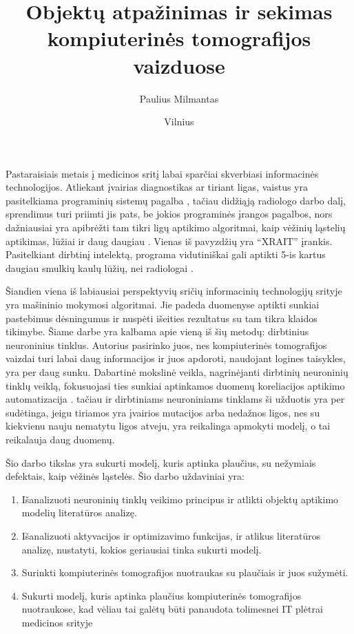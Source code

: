 \documentclass{VUMIFInfKursinis}
\title{Objektų atpažinimas ir sekimas kompiuterinės tomografijos vaizduose}
\author{Paulius Milmantas}
\date{Vilnius \\ \the\year}
\begin{document}
\maketitle

Pastaraisiais metais į medicinos sritį labai sparčiai skverbiasi informacinės technologijos. Atliekant
įvairias diagnostikas ar tiriant ligas, vaistus yra pasitelkiama programinių sistemų pagalba \cite{salt22}, tačiau
didžiąją radiologo darbo dalį, sprendimus turi priimti jis pats, be jokios programinės įrangos pagalbos,
nors dažniausiai yra apibrėžti tam tikri ligų aptikimo algoritmai, kaip vėžinių ląstelių aptikimas,
lūžiai ir daug daugiau \cite{salt23}. Vienas iš pavyzdžių yra \enquote{XRAIT} įrankis. Pasitelkiant dirbtinį intelektą, programa vidutiniškai gali aptikti 5-is kartus daugiau smulkių kaulų lūžių, nei radiologai \cite{salt25}.
\par
Šiandien viena iš labiausiai perspektyvių sričių informacinių technologijų srityje yra mašininio mokymosi algoritmai. 
Jie padeda duomenyse aptikti sunkiai pastebimus dėsningumus ir nuspėti išeities rezultatus su tam tikra klaidos tikimybe.
Šiame darbe yra kalbama apie vieną iš šių metodų: dirbtinius neuroninius tinklus.
Autorius pasirinko juos, nes kompiuterinės tomografijos vaizdai turi labai daug informacijos ir juos apdoroti,
naudojant logines taisykles, yra per daug sunku. 
Dabartinė mokslinė veikla, nagrinėjanti dirbtinių neuroninių tinklų veiklą,
fokusuojasi ties sunkiai aptinkamos duomenų koreliacijos aptikimo
automatizacija \cite{salt24}.
tačiau ir dirbtiniams neuroniniams tinklams ši užduotis yra per sudėtinga, jeigu
tiriamos yra įvairios mutacijos arba nedažnos ligos, nes su kiekvienu nauju nematytu ligos atveju,
yra reikalinga apmokyti modelį, o tai reikalauja daug duomenų. 
\par
Šio darbo tikslas yra sukurti modelį, kuris aptinka plaučius, su nežymiais defektais, kaip vėžinės ląstelės.
Šio darbo uždaviniai yra:
\begin{enumerate}
\item Išanalizuoti neuroninių tinklų veikimo principus ir atlikti objektų aptikimo modelių literatūros analizę.
\item Išanalizuoti aktyvacijos ir optimizavimo funkcijas, ir atlikus literatūros analizę, nustatyti, kokios geriausiai tinka sukurti modelį.
\item Surinkti kompiuterinės tomografijos nuotraukas su plaučiais ir juos sužymėti.
\item Sukurti modelį, kuris aptinka plaučius kompiuterinės tomografijos
nuotraukose, kad vėliau tai galėtų būti panaudota tolimesnei
IT plėtrai medicinos srityje
\end{enumerate}
\end{document}
